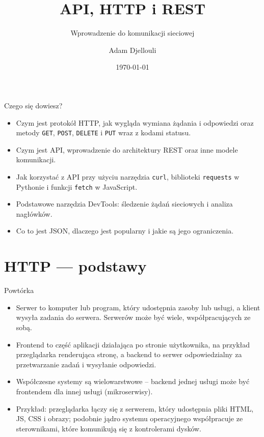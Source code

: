 \documentclass[10pt,compress,usenames,dvipsnames,aspectratio=169]{beamer}
\title{API, HTTP i REST}
\subtitle{Wprowadzenie do komunikacji sieciowej}
\author{Adam Djellouli}
\date{\today}
\begin{document}
\begin{frame}[plain]
  \titlepage
\end{frame}

\begin{frame}[fragile]{Czego się dowiesz?}
  \begin{itemize}
    \item Czym jest protokół HTTP, jak wygląda wymiana żądania i odpowiedzi oraz metody \texttt{GET}, \texttt{POST}, \texttt{DELETE} i \texttt{PUT} wraz z kodami statusu.
    \item Czym jest API, wprowadzenie do architektury REST oraz inne modele komunikacji.
    \item Jak korzystać z API przy użyciu narzędzia \texttt{curl}, biblioteki \texttt{requests} w Pythonie i funkcji \texttt{fetch} w JavaScript.
    \item Podstawowe narzędzia DevTools: śledzenie żądań sieciowych i analiza nagłówków.
    \item Co to jest JSON, dlaczego jest popularny i jakie są jego ograniczenia.
  \end{itemize}
\end{frame}

\section{HTTP — podstawy}

\begin{frame}{Powtórka}
  \begin{itemize}
    \item Serwer to komputer lub program, który udostępnia zasoby lub usługi, a klient wysyła zadania do serwera. Serwerów może być wiele, współpracujących ze sobą.
    \item Frontend to część aplikacji działająca po stronie użytkownika, na przykład przeglądarka renderująca stronę, a backend to serwer odpowiedzialny za przetwarzanie zadań i wysyłanie odpowiedzi.
    \item Współczesne systemy są wielowarstwowe – backend jednej usługi może być frontendem dla innej usługi (mikroserwisy).
    \item Przykład: przeglądarka łączy się z serwerem, który udostępnia pliki HTML, JS, CSS i obrazy; podobnie jądro systemu operacyjnego współpracuje ze sterownikami, które komunikują się z kontrolerami dysków.
  \end{itemize}
\end{frame}
\end{document}

